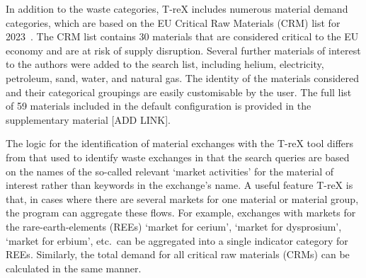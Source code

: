 In addition to the waste categories, T-reX includes numerous material demand categories, which are based on the EU Critical Raw Materials (CRM) list for 2023~\citep{eu2023crmstudy}. The CRM list contains 30 materials that are considered critical to the EU economy and are at risk of supply disruption. Several further materials of interest to the authors were added to the search list, including helium, electricity, petroleum, sand, water, and natural gas. The identity of the materials considered and their categorical groupings are easily customisable by the user. The full list of 59 materials included in the default configuration is provided in the supplementary material [ADD LINK].

The logic for the identification of material exchanges with the T-reX tool differs from that used to identify waste exchanges in that the search queries are based on the names of the so-called relevant `market activities' for the material of interest rather than keywords in the exchange's name. A useful feature T-reX is that, in cases where there are several markets for one material or material group, the program can aggregate these flows. For example, exchanges with markets for the rare-earth-elements (REEs) `market for cerium', `market for dysprosium', `market for erbium', etc.\ can be aggregated into a single indicator category for REEs. Similarly, the total demand for all critical raw materials (CRMs) can be calculated in the same manner. 

